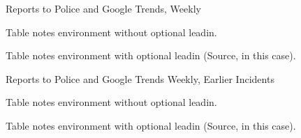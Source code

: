 \documentclass[AER]{AEA}
\begin{document}
\begin{table}
\caption{Reports to Police and Google Trends, Weekly}



\begin{tablenotes}
Table notes environment without optional leadin.
\end{tablenotes}
\begin{tablenotes}[Source]
Table notes environment with optional leadin (Source, in this case).
\end{tablenotes}
\end{table}

\begin{table}
\caption{Reports to Police and Google Trends Weekly, Earlier Incidents}



\begin{tablenotes}
Table notes environment without optional leadin.
\end{tablenotes}
\begin{tablenotes}[Source]
Table notes environment with optional leadin (Source, in this case).
\end{tablenotes}
\end{table}
\end{document}
